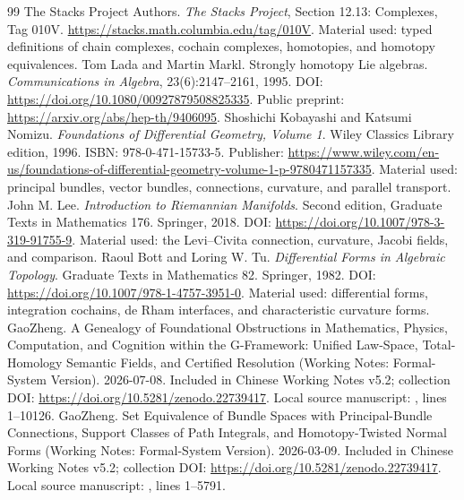 \documentclass[12pt,a4paper,openany,notitlepage]{report}
\theoremstyle{plain}
\theoremstyle{definition}
\theoremstyle{remark}
\begin{document}
\begin{CJK*}
\begin{thebibliography} {99}
 The Stacks Project Authors. \emph {The Stacks Project}, Section 12.13: Complexes, Tag 010V.
\newblock \url{https://stacks.math.columbia.edu/tag/010V}.
\newblock Material used: typed definitions of chain complexes, cochain complexes, homotopies, and homotopy equivalences.
 Tom Lada and Martin Markl. Strongly homotopy Lie algebras.
\emph {Communications in Algebra}, 23(6):2147--2161, 1995.
\newblock DOI: \url{https://doi.org/10.1080/00927879508825335}.
\newblock Public preprint: \url{https://arxiv.org/abs/hep-th/9406095}.
 Shoshichi Kobayashi and Katsumi Nomizu. \emph {Foundations of Differential Geometry, Volume 1}. Wiley Classics Library edition, 1996.
\newblock ISBN: 978-0-471-15733-5.
\newblock Publisher: \url{https://www.wiley.com/en-us/foundations-of-differential-geometry-volume-1-p-9780471157335}.
\newblock Material used: principal bundles, vector bundles, connections, curvature, and parallel transport.
 John M. Lee. \emph {Introduction to Riemannian Manifolds}. Second edition, Graduate Texts in Mathematics 176. Springer, 2018.
\newblock DOI: \url{https://doi.org/10.1007/978-3-319-91755-9}.
\newblock Material used: the Levi--Civita connection, curvature, Jacobi fields, and comparison.
 Raoul Bott and Loring W. Tu. \emph {Differential Forms in Algebraic Topology}. Graduate Texts in Mathematics 82. Springer, 1982.
\newblock DOI: \url{https://doi.org/10.1007/978-1-4757-3951-0}.
\newblock Material used: differential forms, integration cochains, de Rham interfaces, and characteristic curvature forms.
 GaoZheng. A Genealogy of Foundational Obstructions in Mathematics, Physics, Computation, and Cognition within the G-Framework: Unified Law-Space, Total-Homology Semantic Fields, and Certified Resolution (Working Notes: Formal-System Version). 2026-07-08.
\newblock Included in Chinese Working Notes v5.2; collection DOI: \url{https://doi.org/10.5281/zenodo.22739417}.
\newblock Local source manuscript: , lines 1--10126.
 GaoZheng. Set Equivalence of Bundle Spaces with Principal-Bundle Connections, Support Classes of Path Integrals, and Homotopy-Twisted Normal Forms (Working Notes: Formal-System Version). 2026-03-09.
\newblock Included in Chinese Working Notes v5.2; collection DOI: \url{https://doi.org/10.5281/zenodo.22739417}.
\newblock Local source manuscript: , lines 1--5791.
\end{thebibliography}
\clearpage

\end{CJK*}
\end{document}
